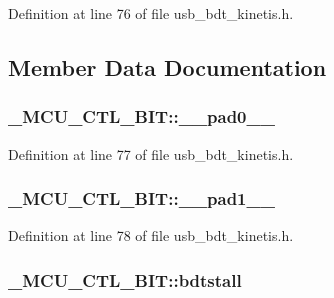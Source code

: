 Definition at line 76 of file usb\+\_\+bdt\+\_\+kinetis.\+h.



\subsection{Member Data Documentation}
\subsubsection[{\texorpdfstring{\+\_\+\+\_\+pad0\+\_\+\+\_\+}{__pad0__}}]{ \+\_\+\+M\+C\+U\+\_\+\+C\+T\+L\+\_\+\+B\+I\+T\+::\+\_\+\+\_\+pad0\+\_\+\+\_\+}\hypertarget{struct___m_c_u___c_t_l___b_i_t_a4207c6b8e00a06b5e7da5f66109350d5}{}\label{struct___m_c_u___c_t_l___b_i_t_a4207c6b8e00a06b5e7da5f66109350d5}


Definition at line 77 of file usb\+\_\+bdt\+\_\+kinetis.\+h.

\subsubsection[{\texorpdfstring{\+\_\+\+\_\+pad1\+\_\+\+\_\+}{__pad1__}}]{ \+\_\+\+M\+C\+U\+\_\+\+C\+T\+L\+\_\+\+B\+I\+T\+::\+\_\+\+\_\+pad1\+\_\+\+\_\+}\hypertarget{struct___m_c_u___c_t_l___b_i_t_ab1ce0a4a2a37f1f2e440d27b7edcabb0}{}\label{struct___m_c_u___c_t_l___b_i_t_ab1ce0a4a2a37f1f2e440d27b7edcabb0}


Definition at line 78 of file usb\+\_\+bdt\+\_\+kinetis.\+h.

\subsubsection[{\texorpdfstring{bdtstall}{bdtstall}}]{ \+\_\+\+M\+C\+U\+\_\+\+C\+T\+L\+\_\+\+B\+I\+T\+::bdtstall}\hypertarget{struct___m_c_u___c_t_l___b_i_t_a369153602b4e76acf326947fb83a119a}{}\label{struct___m_c_u___c_t_l___b_i_t_a369153602b4e76acf326947fb83a119a}


